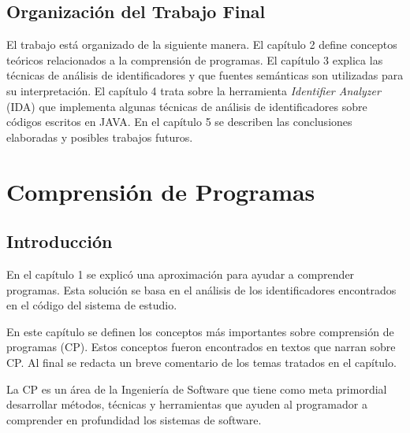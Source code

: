 \documentclass[a4paper,12pt]{report}
\begin{document}

\section{Organización del Trabajo Final}

El trabajo está organizado de la siguiente manera. El capítulo 2 define conceptos teóricos relacionados a la comprensión de programas. El capítulo 3 explica las técnicas de análisis de identificadores y que fuentes semánticas son utilizadas para su interpretación. El capítulo 4 trata sobre la herramienta \textit{Identifier Analyzer} (IDA) que implementa algunas técnicas de análisis de identificadores sobre códigos escritos en JAVA.
En el capítulo 5 se describen las conclusiones elaboradas y posibles trabajos futuros.



\chapter{Comprensión de Programas}
\section{Introducción}

En el capítulo 1 se explicó una aproximación para ayudar a comprender programas. Esta solución se basa en el análisis de los identificadores encontrados en el código del sistema de estudio.

En este capítulo se definen los conceptos más importantes sobre comprensión de programas (CP). Estos conceptos fueron encontrados en textos que narran sobre CP. Al final se redacta un breve comentario de los temas tratados en el capítulo.

La CP es un área de la Ingeniería de Software que tiene como meta primordial desarrollar métodos, técnicas y herramientas que ayuden al programador a comprender en profundidad los sistemas de software. 
\end{document}
